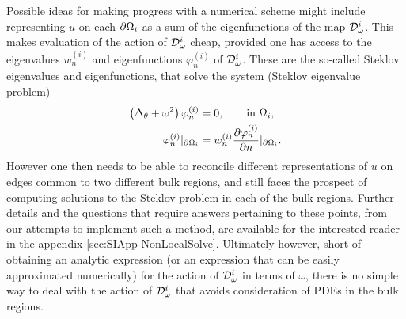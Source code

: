 Possible ideas for making progress with a numerical scheme might include representing $u$ on each $\partial\Omega_i$ as a sum of the eigenfunctions of the map $\mathcal{D}^i_\omega$.
This makes evaluation of the action of $\mathcal{D}^i_\omega$ cheap, provided one has access to the eigenvalues $w^{(i)}_n$ and eigenfunctions $\varphi^{(i)}_n$ of $\mathcal{D}^i_\omega$.
These are the so-called Steklov eigenvalues and eigenfunctions, that solve the system (Steklov eigenvalue problem)
\begin{align*}
	\left( \Delta_\theta + \omega^2 \right)\varphi^{(i)}_n &= 0, \qquad\text{in } \Omega_i, \\
	\varphi^{(i)}_n\vert_{\partial\Omega_i} &= w^{(i)}_n\dfrac{\partial \varphi^{(i)}_n}{\partial n}\vert_{\partial\Omega_i}. 
\end{align*}
However one then needs to be able to reconcile different representations of $u$ on edges common to two different bulk regions, and still faces the prospect of computing solutions to the Steklov problem in each of the bulk regions.
Further details and the questions that require answers pertaining to these points, from our attempts to implement such a method, are available for the interested reader in the appendix \ref{sec:SIApp-NonLocalSolve}.
Ultimately however, short of obtaining an analytic expression (or an expression that can be easily approximated numerically) for the action of $\mathcal{D}^i_{\omega}$ in terms of $\omega$, there is no simple way to deal with the action of $\mathcal{D}^i_{\omega}$ that avoids consideration of PDEs in the bulk regions.

